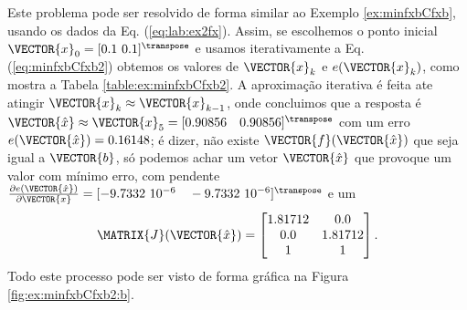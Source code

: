 \begin{SolutionT}
\label{ex:minfxbCfxb2:sol1}
Este problema pode ser resolvido de forma similar ao Exemplo \ref{ex:minfxbCfxb},
usando os dados da Eq. (\ref{eq:lab:ex2fx}).
Assim, se escolhemos o ponto inicial $\VECTOR{x}_0=[0.1~0.1]^{\transpose}$ 
e usamos iterativamente a Eq. (\ref{eq:minfxbCfxb2}) obtemos os valores 
de $\VECTOR{x}_k$ e $e(\VECTOR{x}_k)$, como mostra a Tabela \ref{table:ex:minfxbCfxb2}.
A aproximação iterativa é feita ate atingir $\VECTOR{x}_k \approx \VECTOR{x}_{k-1}$,
onde concluimos que a resposta é $\VECTOR{\hat{x}}\approx \VECTOR{x}_5 =[0.90856\quad 0.90856]^{\transpose}$
com um erro $e(\VECTOR{\hat{x}})=0.16148$; é dizer, não existe $\VECTOR{f}(\VECTOR{\hat{x}})$
que seja igual a $\VECTOR{b}$, só podemos achar um vetor $\VECTOR{\hat{x}}$ 
que provoque um valor com mínimo erro, com pendente 
$\frac{\partial e(\VECTOR{\hat{x}})}{\partial \VECTOR{x} }=[-9.7332~10^{-6}\quad -9.7332~{10}^{-6}]^{\transpose}$
e um
\begin{equation}
\MATRIX{J}(\VECTOR{\hat{x}})=
\begin{bmatrix}
1.81712 & 0.0\\ 
0.0     & 1.81712\\
1       & 1
\end{bmatrix}.
\end{equation}
Todo este processo pode ser visto de forma gráfica na Figura \ref{fig:ex:minfxbCfxb2:b}.
\end{SolutionT}

